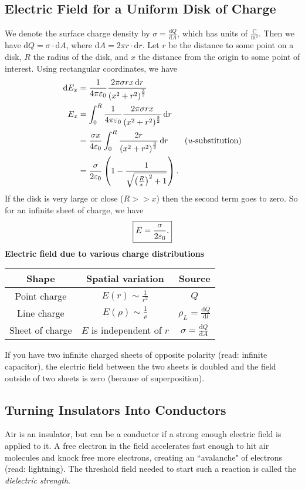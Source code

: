 \documentclass[class=article, crop=false]{standalone}
\begin{document}
  \subsection{Electric Field for a Uniform Disk of Charge}
  We denote the surface charge density by $\sigma = \frac{\mathrm{d}Q}{\mathrm{d}A}$, which has units of $\frac{\mathrm{C}}{\mathrm{m}^2}$. Then we have $\mathrm{d}Q = \sigma\cdot \mathrm{d}A$, where $\mathrm{d}A = 2\pi r\cdot \mathrm{d}r$. Let $r$ be the distance to some point on a disk, $R$ the radius of the disk, and $x$ the distance from the origin to some point of interest. Using rectangular coordinates, we have
  \begin{align*}
    \mathrm{d}E_x &= \frac{1}{4\pi\varepsilon_0}\frac{2\pi\sigma rx \,\mathrm{d}r}{\left( x^2 + r^2 \right)^{\frac{3}{2}}} \\
    E_x &= \int_{0}^{R}\frac{1}{4\pi\varepsilon_0}\frac{2\pi\sigma rx}{\left( x^2 + r^2 \right)^{\frac{3}{2}}}\,\mathrm{d}r \\
        &= \frac{\sigma x}{4\varepsilon_0}\int_{0}^{R}\frac{2r}{\left( x^2 + r^2 \right)^{\frac{3}{2}}} \,\mathrm{d}r \tag{$u$-substitution} \\
        &= \frac{\sigma}{2\varepsilon_0}\left( 1 - \frac{1}{\sqrt{\left( \frac{R}{x} \right)^2+1}} \right).
  \end{align*}
  If the disk is very large or close ($R >> x$) then the second term goes to zero. So for an infinite sheet of charge, we have
  \[
    \boxed{E = \frac{\sigma}{2\varepsilon_0}.}
  \]
  \textbf{Electric field due to various charge distributions}
  \begin{center}
    \begin{tabular}{c|c|c}
      Shape & Spatial variation & Source \\
      \hline
      Point charge & $E(r)\sim \frac{1}{r^2}$ & $Q$ \\[10pt]
      Line charge & $E(\rho)\sim \frac{1}{\rho}$ & $\rho_L = \frac{\mathrm{d}Q}{\mathrm{d}l}$ \\[10pt]
      Sheet of charge & $E$ is independent of $r$ & $\sigma = \frac{\mathrm{d}Q}{\mathrm{d}A}$
    \end{tabular}
  \end{center}
  If you have two infinite charged sheets of opposite polarity (read: infinite capacitor), the electric field between the two sheets is doubled and the field outside of two sheets is zero (because of superposition).
  \subsection{Turning Insulators Into Conductors}
  Air is an insulator, but can be a conductor if a strong enough electric field is applied to it. A free electron in the field accelerates fast enough to hit air molecules and knock free more electrons, creating an ``avalanche" of electrons (read: lightning). The threshold field needed to start such a reaction is called the \emph{dielectric strength}.
  \newpage
\end{document}

